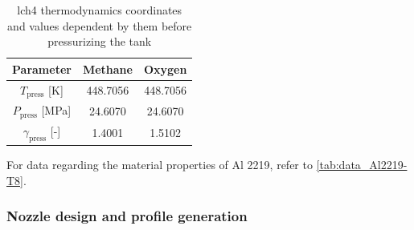 \begin{table}[H]      
    \centering
    \begin{tabular}{|c|c|c|}
    \hline
    \textbf{Parameter} & \textbf{Methane} & \textbf{Oxygen} \\ \hline
    $T_{\text{press}} $  [K] & 448.7056 & 448.7056 \\ \hline
    $P_{\text{press}}$ [MPa] & 24.6070 & 24.6070\\ \hline
    $\gamma_{\text{press}}$ [-] & 1.4001 & 1.5102\\ \hline
\end{tabular}
    \caption{\acrshort{lch4} thermodynamics coordinates and values dependent by them before pressurizing the tank}
    \label{tab:data_press_ch4}
\end{table}

For data regarding the material properties of Al 2219, refer to \cref{tab:data_Al2219-T8}.
\subsubsection*{Nozzle design and profile generation}


\printbibliography

 
